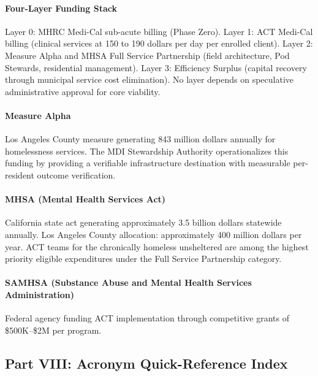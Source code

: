 {\paragraph{Four-Layer Funding Stack} Layer 0: MHRC Medi-Cal sub-acute billing (Phase Zero). Layer 1: ACT Medi-Cal billing (clinical services at 150 to 190 dollars per day per enrolled client). Layer 2: Measure Alpha and MHSA Full Service Partnership (field architecture, Pod Stewards, residential management). Layer 3: Efficiency Surplus (capital recovery through municipal service cost elimination). No layer depends on speculative administrative approval for core viability.

\paragraph{Measure Alpha} Los Angeles County measure generating 843 million dollars annually for homelessness services. The MDI Stewardship Authority operationalizes this funding by providing a verifiable infrastructure destination with measurable per-resident outcome verification.

\paragraph{MHSA (Mental Health Services Act)} California state act generating approximately 3.5 billion dollars statewide annually. Los Angeles County allocation: approximately 400 million dollars per year. ACT teams for the chronically homeless unsheltered are among the highest priority eligible expenditures under the Full Service Partnership category.

\paragraph{SAMHSA (Substance Abuse and Mental Health Services Administration)} Federal agency funding ACT implementation through competitive grants of \$500K--\$2M per program.

\bigskip
\subsection*{Part VIII: Acronym Quick-Reference Index}

}

